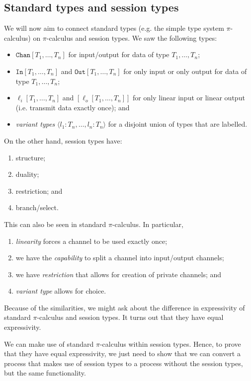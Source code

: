 \documentclass[a4paper, openany]{memoir}
\theoremstyle{definition}
\begin{document}
    \subsection{Standard types and session types}
    We will now aim to connect standard types (e.g. the simple type system $\pi$-calculus) on $\pi$-calculus and session types. We saw the following types:
    \begin{itemize}
        \item $\texttt{Chan}[T_1, \dots, T_n]$ for input/output for data of type $T_1, \dots, T_n$;
        \item $\texttt{In}[T_1, \dots, T_n]$ and $\texttt{Out}[T_1, \dots, T_n]$ for only input or only output for data of type $T_1, \dots, T_n$;
        \item $\ell_i[T_1, \dots, T_n]$ and $[\ell_o[T_1, \dots, T_n]]$ for only linear input or linear output (i.e. transmit data exactly once); and
        \item \emph{variant types} $\langle l_1 \colon T_n, \dots, l_n \colon T_n \rangle$ for a disjoint union of types that are labelled.
    \end{itemize}
    On the other hand, session types have:
    \begin{enumerate}
        \item structure;
        \item duality;
        \item restriction; and
        \item branch/select.
    \end{enumerate}
    This can also be seen in standard $\pi$-calculus. In particular,
    \begin{enumerate}
        \item \emph{linearity} forces a channel to be used exactly once;
        \item we have the \emph{capability} to split a channel into input/output channels;
        \item we have \emph{restriction} that allows for creation of private channels; and
        \item \emph{variant type} allows for choice.
    \end{enumerate}
    Because of the similarities, we might ask about the difference in expressivity of standard $\pi$-calculus and session types. It turns out that they have equal expressivity.

    We can make use of standard $\pi$-calculus within session types. Hence, to prove that they have equal expressivity, we just need to show that we can convert a process that makes use of session types to a process without the session types, but the same functionality. 
    
\end{document}
